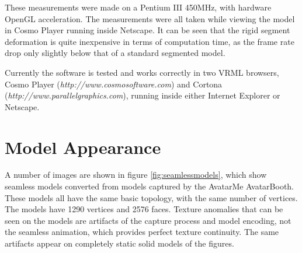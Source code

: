 \documentclass[10pt,oneside,fleqn,a4paper]{book}
\begin{document}
These measurements were made on a Pentium III 450MHz, with hardware OpenGL acceleration. The measurements were all taken while viewing the model in Cosmo Player running inside Netscape. It can be seen that the rigid segment deformation is quite inexpensive in terms of computation time, as the frame rate drop only slightly below that of a standard segmented model.

Currently the software is tested and works correctly in two VRML browsers, Cosmo Player ({\it http://www.cosmosoftware.com}) and Cortona ({\it http://www.parallelgraphics.com}), running inside either Internet Explorer or Netscape.

\section{\label{sec:resultappearance}Model Appearance}
A number of images are shown in figure \ref{fig:seamlessmodels}, which show seamless models converted from models captured by the AvatarMe AvatarBooth. These models all have the same basic topology, with the same number of vertices. The models have 1290 vertices and 2576 faces. Texture anomalies that can be seen on the models are artifacts of the capture process and model encoding, not the seamless animation, which provides perfect texture continuity. The same artifacts appear on completely static solid models of the figures.
\end{document}
